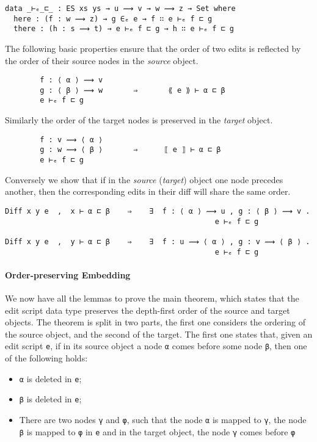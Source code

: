 \documentclass[preprint]{sigplanconf}
\begin{document}
\begin{verbatim}
data _⊢ₑ_⊏_ : ES xs ys → u ⟿ v → w ⟿ z → Set where
  here : (f : w ⟿ z) → g ∈ₑ e → f ∷ e ⊢ₑ f ⊏ g 
  there : (h : s ⟿ t) → e ⊢ₑ f ⊏ g → h ∷ e ⊢ₑ f ⊏ g 
\end{verbatim}

    The following basic properties ensure that the order of two edits 
    is reflected by the order of their source nodes in the \emph{source} object.
\begin{verbatim}
        f : ⟨ α ⟩ ⟿ v 
        g : ⟨ β ⟩ ⟿ w       ⇒       ⟪ e ⟫ ⊢ α ⊏ β
        e ⊢ₑ f ⊏ g 
\end{verbatim}
    Similarly the order of the target nodes is preserved in the \emph{target} 
    object.    

\begin{verbatim}
        f : v ⟿ ⟨ α ⟩
        g : w ⟿ ⟨ β ⟩       ⇒      ⟦ e ⟧ ⊢ α ⊏ β
        e ⊢ₑ f ⊏ g
\end{verbatim}

    Conversely we show that if in the \emph{source} (\emph{target}) 
    object one node precedes another, then the corresponding edits in their diff 
    will share the same order.
\begin{verbatim}
Diff x y e  ,  x ⊢ α ⊏ β    ⇒    ∃  f : ⟨ α ⟩ ⟿ u , g : ⟨ β ⟩ ⟿ v . 
                                                e ⊢ₑ f ⊏ g

Diff x y e  ,  y ⊢ α ⊏ β    ⇒    ∃  f : u ⟿ ⟨ α ⟩ , g : v ⟿ ⟨ β ⟩ . 
                                                e ⊢ₑ f ⊏ g
\end{verbatim}

    \paragraph{Order-preserving Embedding}
    We now have all the lemmas to prove the main theorem, 
    which states that the edit script data type preserves the depth-first order of
    the source and target objects.
    The theorem is split in two parts, the first one considers 
    the ordering of the source object, and the second of the target.
    The first one states that, given an edit script \texttt{e}, 
    if in its source object a node \texttt{α} comes before
    some node \texttt{β}, then one of the following holds:
    \begin{itemize}
    \item \texttt{α} is deleted in \texttt{e};
    \item \texttt{β} is deleted in \texttt{e};
    \item There are two nodes \texttt{γ} and \texttt{φ}, such that the node 
    \texttt{α} is 	mapped to \texttt{γ}, the node \texttt{β} is mapped to 
    \texttt{φ} in \texttt{e} and 
    in the target	object, the node \texttt{γ} comes before \texttt{φ}
    \end{itemize}
\end{document}

